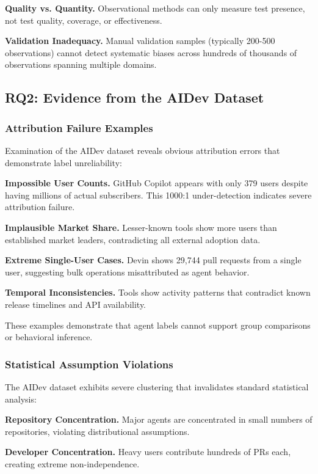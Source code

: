 \documentclass[conference]{IEEEtran}
\begin{document}
\textbf{Quality vs. Quantity.} Observational methods can only measure test presence, not test quality, coverage, or effectiveness.

\textbf{Validation Inadequacy.} Manual validation samples (typically 200-500 observations) cannot detect systematic biases across hundreds of thousands of observations spanning multiple domains.

\subsection{RQ2: Evidence from the AIDev Dataset}

\subsubsection{Attribution Failure Examples}

Examination of the AIDev dataset reveals obvious attribution errors that demonstrate label unreliability:

\textbf{Impossible User Counts.} GitHub Copilot appears with only 379 users despite having millions of actual subscribers. This 1000:1 under-detection indicates severe attribution failure.

\textbf{Implausible Market Share.} Lesser-known tools show more users than established market leaders, contradicting all external adoption data.

\textbf{Extreme Single-User Cases.} Devin shows 29,744 pull requests from a single user, suggesting bulk operations misattributed as agent behavior.

\textbf{Temporal Inconsistencies.} Tools show activity patterns that contradict known release timelines and API availability.

These examples demonstrate that agent labels cannot support group comparisons or behavioral inference.

\subsubsection{Statistical Assumption Violations}

The AIDev dataset exhibits severe clustering that invalidates standard statistical analysis:

\textbf{Repository Concentration.} Major agents are concentrated in small numbers of repositories, violating distributional assumptions.

\textbf{Developer Concentration.} Heavy users contribute hundreds of PRs each, creating extreme non-independence.
\end{document}
